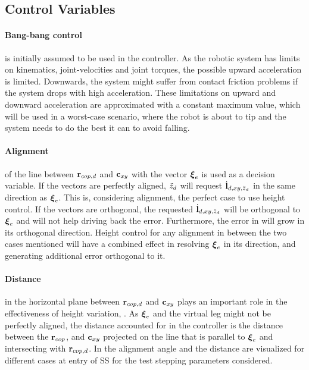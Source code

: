 \subsection{Control Variables}\label{sec:strategy}
\paragraph{Bang-bang control}  is initially assumed to be used in the controller. As the robotic system has limits on kinematics, joint-velocities and joint torques, the possible upward acceleration is limited. Downwards, the system might suffer from contact friction problems if the system drops with high acceleration. These limitations on upward and downward acceleration are approximated with a constant maximum value, which will be used in a worst-case scenario, where the robot is about to tip and the system needs to do the best it can to avoid falling.

%
\paragraph{Alignment} of the line between $\mathbf{r}_{cop,d}$ and $\mathbf{c}_{xy}$ with the vector $\boldsymbol{\xi}_e$ is used as a decision variable. If the vectors are perfectly aligned, $\ddot{z}_d$ will request $\dot{\mathbf{l}}_{d,xy,\ddot{z}_d}$ in the same direction as $\boldsymbol{\xi}_e$. This is, considering alignment, the perfect case to use height control. If the vectors are orthogonal, the requested $\dot{\mathbf{l}}_{d,xy,\ddot{z}_d}$ will be orthogonal to $\boldsymbol{\xi}_e$ and will not help driving back the error. Furthermore, the error in will grow in its orthogonal direction. Height control for any alignment in between the two cases mentioned will have a combined effect in resolving $\boldsymbol{\xi}_e$ in its direction, and generating additional error orthogonal to it.

\paragraph{Distance} in the horizontal plane between $\mathbf{r}_{cop,d}$ and $\mathbf{c}_{xy}$ plays an important role in the effectiveness of height variation, . As $\boldsymbol{\xi}_e$ and the virtual leg might not be perfectly aligned, the distance accounted for in the controller is the distance between the $\mathbf{r}_{cop}$, and $\mathbf{c}_{xy}$ projected on the line that is parallel to $\boldsymbol{\xi}_e$ and intersecting with $\mathbf{r}_{cop,d}$. In  the alignment angle and the distance are visualized for different cases at entry of \ac{SS} for the test stepping parameters considered.

